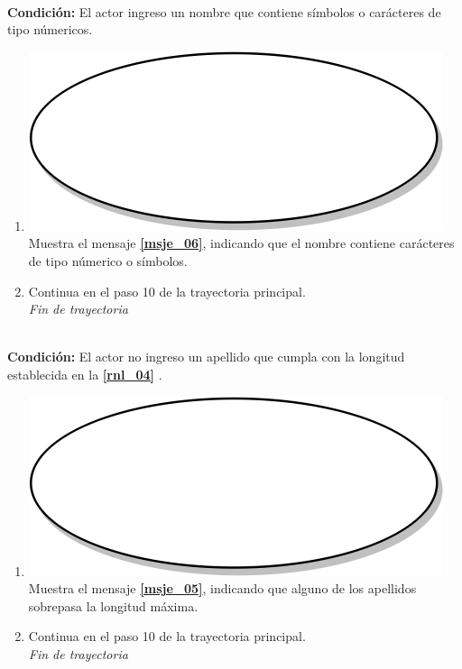 \textbf{} \\
\textbf{Condición:} El actor ingreso un nombre que contiene símbolos o carácteres de tipo númericos.\\
 \begin{enumerate}[label=F\arabic*]
    \item {\includegraphics[scale=.05]{Capitulo3/img/proceso.png} Muestra el mensaje \textbf{\ref{msje_06}}, indicando que el nombre contiene carácteres de tipo númerico o símbolos.}
    \item {Continua en el paso 10 de la trayectoria principal.} \\
    \textit{Fin de trayectoria} \\
\end{enumerate}

\textbf{} \\
\textbf{Condición:} El actor no ingreso un apellido que cumpla con la longitud establecida en la \textbf{\ref{rnl_04}} .\\
 \begin{enumerate}[label=G\arabic*]
    \item {\includegraphics[scale=.05]{Capitulo3/img/proceso.png} Muestra el mensaje \textbf{\ref{msje_05}}, indicando que alguno de los apellidos sobrepasa la longitud máxima.}
    \item {Continua en el paso 10 de la trayectoria principal.} \\
    \textit{Fin de trayectoria} \\
\end{enumerate}

